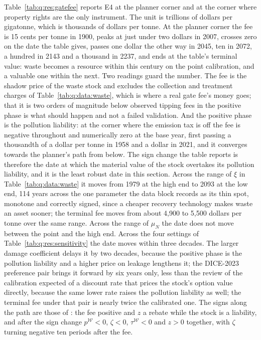 Table~\ref{tab:q:res:gatefee} reports E4 at the planner corner and at the corner where property rights are the only instrument. The unit is trillions of dollars per gigatonne, which is thousands of dollars per tonne. At the planner corner the fee is 15 cents per tonne in 1900, peaks at just under two dollars in 2007, crosses zero on the date the table gives, passes one dollar the other way in 2045, ten in 2072, a hundred in 2143 and a thousand in 2237, and ends at the table's terminal value: waste becomes a resource within this century on the point calibration, and a valuable one within the next. Two readings guard the number. The fee is the shadow price of the waste stock and excludes the collection and treatment charges of Table~\ref{tab:q:data:waste}, which is where a real gate fee's money goes; that it is two orders of magnitude below observed tipping fees in the positive phase is what should happen and not a failed validation. And the positive phase is the pollution liability: at the corner where the emission tax is off the fee is negative throughout and numerically zero at the base year, first passing a thousandth of a dollar per tonne in 1958 and a dollar in 2021, and it converges towards the planner's path from below. The sign change the table reports is therefore the date at which the material value of the stock overtakes its pollution liability, and it is the least robust date in this section. Across the range of $\xi$ in Table~\ref{tab:q:data:waste} it moves from 1979 at the high end to 2093 at the low end, 114 years across the one parameter the data block records as its thin spot, monotone and correctly signed, since a cheaper recovery technology makes waste an asset sooner; the terminal fee moves from about 4,900 to 5,500 dollars per tonne over the same range. Across the range of $\mu_N$ the date does not move between the point and the high end. Across the four settings of Table~\ref{tab:q:res:sensitivity} the date moves within three decades. The larger damage coefficient delays it by two decades, because the positive phase is the pollution liability and a higher price on leakage lengthens it; the DICE-2023 preference pair brings it forward by six years only, less than the review of the calibration expected of a discount rate that prices the stock's option value directly, because the same lower rate raises the pollution liability as well; the terminal fee under that pair is nearly twice the calibrated one. The signs along the path are those of : the fee positive and $z$ a rebate while the stock is a liability, and after the sign change $p^{\mathcal W}<0$, $\zeta<0$, $\tau^{\mathcal W}<0$ and $z>0$ together, with $\zeta$ turning negative ten periods after the fee.

